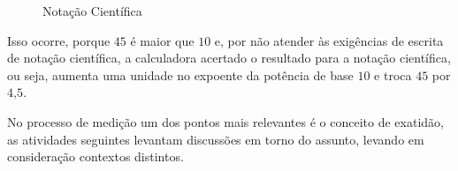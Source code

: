\begin{figure}[H]
\begin{tikzpicture}[every node/.style={scale=1.2}]
\end{tikzpicture}
\caption{Notação Científica}
\end{figure}

Isso ocorre, porque $45$ é maior que $10$ e, por não atender às exigências de escrita de notação científica, a calculadora acertado o resultado para a notação científica, ou seja, aumenta uma unidade no expoente da potência de base $10$ e troca $45$ por $4\text{,}5$.


\label{\detokenize{NO103-5:explorando-medicao-e-exatidao-algarismos-significativos-medidas-irracionais}}\label{\detokenize{NO103-5::doc}}
No processo de medição um dos pontos mais relevantes é o conceito de exatidão, as atividades seguintes levantam discussões em torno do assunto, levando em consideração contextos distintos.
